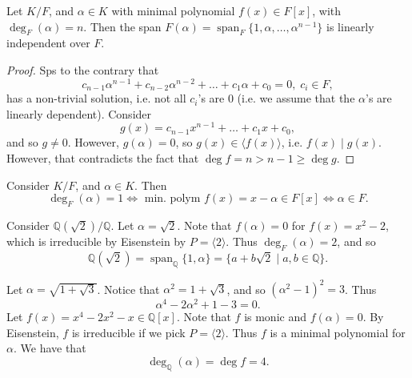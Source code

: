 \documentclass[notoc,notitlepage]{tufte-book}
\DeclareMathOperator{\Span}{span}
\begin{document}
\begin{propo}\label{propo:span_of_an_extension_if_linearly_independent}
  Let $K / F$, and $\alpha \in K$ with minimal polynomial $f(x) \in F[x]$, with $\deg_F(\alpha) = n$. Then
  the span $F(\alpha) = \Span_F \{ 1, \alpha, \ldots, \alpha^{n - 1} \}$ is linearly independent over $F$.
\end{propo}

\begin{proof}
  Sps to the contrary that
  \begin{equation*}
    c_{n - 1} \alpha^{n - 1} + c_{n - 2} \alpha^{n - 2} + \hdots + c_1 \alpha + c_0 = 0, \; c_i \in F,
  \end{equation*}
  has a non-trivial solution, i.e. not all $c_i$'s are $0$ (i.e. we assume that the $\alpha$'s are linearly
  dependent). Consider
  \begin{equation*}
    g(x) = c_{n - 1} x^{n - 1} + \hdots + c_1 x + c_0,
  \end{equation*}
  and so $g \neq 0$. However, $g(\alpha) = 0$, so $g(x) \in \langle f(x) \rangle$, i.e. $f(x) \mid g(x)$.
  However, that contradicts the fact that $\deg f = n > n - 1 \geq \deg g$.
\end{proof}

\begin{eg}
  Consider $K / F$, and $\alpha \in K$. Then
  \begin{equation*}
    \deg_F(\alpha) = 1 \iff \text{ min. polym } f(x) = x - \alpha \in F[x] \iff \alpha \in F.
  \end{equation*}
\end{eg}

\begin{eg}
  Consider $\mathbb{Q}(\sqrt{2}) / \mathbb{Q}$. Let $\alpha = \sqrt{2}$. Note that $f(\alpha) = 0$ for
  $f(x) = x^2 - 2$, which is irreducible by Eisenstein by $P = \langle 2 \rangle$. Thus 
  $\deg_F(\alpha) = 2$, and so
  \begin{equation*}
    \mathbb{Q}(\sqrt{2}) = \Span_{\mathbb{Q}} \{ 1, \alpha \} = \{ a + b \sqrt{2} \mid a, b \in \mathbb{Q} \}.
  \end{equation*}
\end{eg}

\begin{eg}
  Let $\alpha = \sqrt{1 + \sqrt{3}}$. Notice that $\alpha^2 = 1 + \sqrt{3}$, and so $(\alpha^2 - 1)^2 = 3$.
  Thus
  \begin{equation*}
    \alpha^4 - 2 \alpha^2 + 1 - 3 = 0.
  \end{equation*}
  Let $f(x) = x^4 - 2x^2 - x \in \mathbb{Q}[x]$. Note that $f$ is monic and $f(\alpha) = 0$. By Eisenstein,
  $f$ is irreducible if we pick $P = \langle 2 \rangle$. Thus $f$ is a minimal polynomial for $\alpha$. We
  have that
  \begin{equation*}
    \deg_{\mathbb{Q}}(\alpha) = \deg f = 4.
  \end{equation*}
\end{eg}
\end{document}
